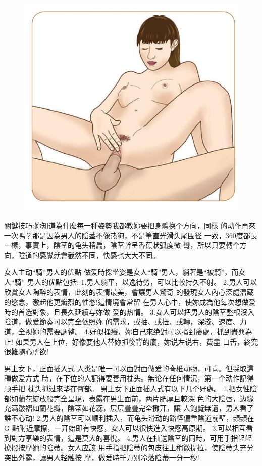 \documentclass[12pt,UTF8]{ctexbook}
\begin{document}
\begin{figure}[htbp]
	\centering
	\includegraphics[width=0.7\linewidth]{26}
	\caption{}
	\label{fig:1}
\end{figure}

關鍵技巧:妳知道為什麼每一種姿勢我都教妳要把身體换个方向，同樣
的动作再來一次嗎？那是因為男人的陰茎不像热狗，不是筆直光滑头尾围径
一致，360度都長一樣，事實上，陰茎的龟头稍扁，陰茎幹呈香蕉狀弧度微
彎，所以只要轉个方向，陰道的感覺就會截然不同，快感也大大不同。

女人主动“騎”男人的优點
做爱時採坐姿是女人“騎”男人，躺著是“被騎”，而女人“騎”
男人的优點包括:
1.男人躺平，以逸待勞，可以比較持久不射。
2.男人可以欣賞女人陶醉的表情，此刻的表情最美，會讓男人驚奇
的發現女人內心深處潜藏的慾念，激起他更熾烈的性慾!這情境會常留
在男人心中，使妳成為他每次想做爱時的首选對象，且長久延續与妳做
爱的热情。
3.女人可以把男人的陰茎整根沒入陰道，做爱節奏可以完全依照妳
的需求，或抽、或扭、或轉，深淺、速度、力道，全视妳的需要調整。
4.好似搔癢，妳自己來绝對可以搔到癢處，抓到盡興為止!
如果男人在上位，好像要他人替妳抓後背的癢，妳说左说右，費盡
口舌，終究很難随心所欲!

男上女下，正面插入式
人类是唯一可以面對面做爱的脊椎动物，可喜。但採取這種做爱方式
時，在下位的人記得要善用枕头。無论在任何情況，第一个动作記得顺手把
枕头抓过來墊在臀部。
男上女下正面插入式有以下几个好處。
1.把女性陰部如蘭花綻放般完全呈現，表露在男生面前，两片肥厚且較深
色的大陰唇，边緣充满皺褶如蘭花瓣，陰蒂如花蕊，层层疊疊完全攤开，讓
人飽覽無遺，男人看了誰不心动!
2.男人的陰茎可以顺利插入，而龟头滑动的路径偏重陰道前壁，頻頻在G
點附近摩擦，一开始即有快感，女人可以很快進入快感高原期。
3.可以相互看到對方享樂的表情，這是莫大的喜悅。
4.男人在抽送陰茎的同時，可用手指轻轻撩撥按摩她的陰蒂。女人应該
用手指把陰蒂的包皮往上稍微提拉，使陰蒂头充分突出外露，讓男人轻触按
摩，做爱時千万别冷落陰蒂一分一秒!
\end{document}
